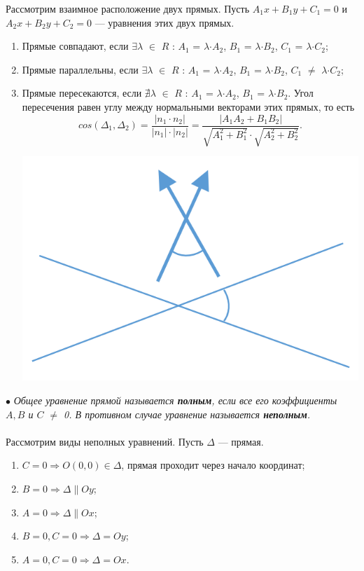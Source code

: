 Рассмотрим взаимное расположение двух прямых. Пусть $A_1 x + B_1 y + C_1 = 0$ и $A_2 x + B_2 y + C_2 = 0$ --- уравнения этих двух прямых.
\begin{enumerate}
	\item Прямые совпадают, если $\exists$$\lambda$ $\in$ $R$ : $A_1$ = $\lambda$$\cdot$$A_2$, $B_1$ = $\lambda$$\cdot$$B_2$, $C_1$ = $\lambda$$\cdot$$C_2$;
	\item Прямые параллельны, если $\exists$$\lambda$ $\in$ $R$ : $A_1$ = $\lambda$$\cdot$$A_2$, $B_1$ = $\lambda$$\cdot$$B_2$, $C_1$ $\not=$ $\lambda$$\cdot$$C_2$;
	\item Прямые пересекаются, если $\nexists$$\lambda$ $\in$ $R$ : $A_1$ = $\lambda$$\cdot$$A_2$, $B_1$ = $\lambda$$\cdot$$B_2$. Угол пересечения равен углу между нормальными векторами этих прямых, то есть$$cos(\Delta_1, \Delta_2) = \dfrac{|n_1\cdot n_2|}{|n_1| \cdot |n_2|} = \dfrac{|A_1 A_2 + B_1 B_2|}{\sqrt{A_1^2 + B_1^2} \cdot \sqrt{A_2^2 + B_2^2}}.$$
	\begin{center}\includegraphics[scale=0.4]{images/corn3_1.png}\end{center}
\end{enumerate}
$\bullet$ \textit{Общее уравнение прямой называется \textbf{полным}, если все его коэффициенты $A, B$ и $C$ $\not=$ 0. В противном случае уравнение называется \textbf{неполным}.} \\\\
Рассмотрим виды неполных уравнений. Пусть $\Delta$ --- прямая.
\begin{enumerate}
	\item $C = 0 \Rightarrow O(0,0) \in \Delta$, прямая проходит через начало координат;
	\item $B = 0 \Rightarrow \Delta \parallel Oy$;
	\item $A = 0 \Rightarrow \Delta \parallel Ox$;
	\item $B = 0, C= 0 \Rightarrow \Delta = Oy$;
	\item $A = 0, C= 0 \Rightarrow \Delta = Ox$.
\end{enumerate}
